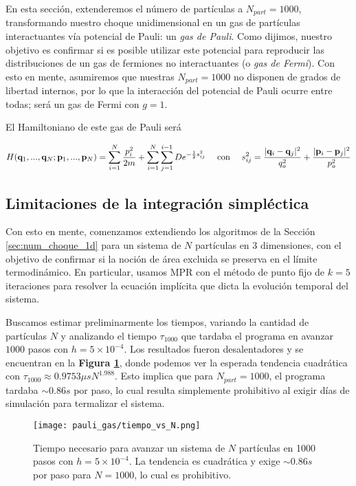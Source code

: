 En esta sección, extenderemos el número de partículas a $N_{part}=1000$, transformando nuestro choque unidimensional en un gas de partículas interactuantes vía potencial
de Pauli: un \textit{gas de Pauli}.
Como dijimos, nuestro objetivo es confirmar si es posible utilizar este potencial para reproducir las distribuciones de un gas de fermiones no interactuantes (o \textit{gas de Fermi}).
Con esto en mente, asumiremos que nuestras $N_{part}=1000$ no disponen de grados de libertad internos, por lo que la interacción del potencial de Pauli ocurre entre todas; 
será un gas de Fermi con $g=1$.

El Hamiltoniano de este gas de Pauli será

\begin{equation}{\label{eq:pauli_gas_ham}}
 H(\mathbf{q}_1, ...,\mathbf{q}_N; \mathbf{p}_1,..., \mathbf{p}_N) = \sum_{i=1}^{N} \frac{p_i^2}{2m} + \sum_{i=1}^N\sum_{j=1}^{i-1} De^{-\frac{1}{2}s_{ij}^2}
 \quad \text{ con } \quad s_{ij}^2 = \frac{|\mathbf{q}_i-\mathbf{q}_j|^2}{q_o^2} + \frac{|\mathbf{p}_i-\mathbf{p}_j|^2}{p_o^2}
\end{equation}

\subsection{Limitaciones de la integración simpléctica}

Con esto en mente, comenzamos extendiendo los algoritmos de la Sección \ref{sec:num_choque_1d} para un sistema de $N$ partículas en 3 dimensiones, con el objetivo
de confirmar si la noción de área excluida se preserva en el límite termodinámico.
En particular, usamos MPR con el método de punto fijo de $k=5$ iteraciones para resolver la ecuación implícita que dicta la evolución temporal del sistema.

Buscamos estimar preliminarmente los tiempos, variando la cantidad de partículas $N$ y analizando el tiempo $\tau_{1000}$ que tardaba el programa en avanzar
$1000$ pasos con $h=5\times10^{-4}$.
Los resultados fueron desalentadores y se encuentran en la \textbf{Figura \ref{fig:tiempo_vs_N}}, donde podemos ver la esperada tendencia cuadrática con
$\tau_{1000} \approx 0.9753\mu s N^{1.988}$.
Esto implica que para $N_{part}=1000$, el programa tardaba $\sim0.86s$ por paso, lo cual resulta simplemente prohibitivo al exigir días de simulación para termalizar el sistema.

\begin{figure}[h]
	\centering
	\texttt{[image: pauli\_gas/tiempo\_vs\_N.png]}
	\caption{Tiempo necesario para avanzar un sistema de $N$ partículas en 1000 pasos con $h=5\times10^{-4}$.
	La tendencia es cuadrática y exige $\sim0.86s$ por paso para $N=1000$, lo cual es prohibitivo.}
	\label{fig:tiempo_vs_N}
\end{figure}

